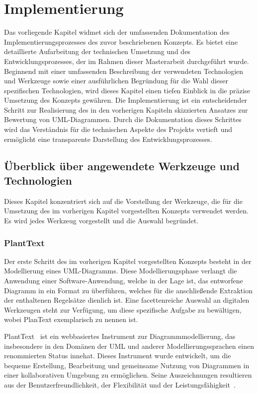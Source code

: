 \chapter{Implementierung}\label{ch:implementierung}

Das vorliegende Kapitel widmet sich der umfassenden Dokumentation des Implementierungsprozesses des zuvor beschriebenen
Konzepts. Es bietet eine detaillierte Aufarbeitung der technischen Umsetzung und des Entwicklungsprozesses, der im
Rahmen dieser Masterarbeit durchgeführt wurde. Beginnend mit einer umfassenden Beschreibung der verwendeten Technologien
und Werkzeuge sowie einer ausführlichen Begründung für die Wahl dieser spezifischen Technologien, wird dieses Kapitel
einen tiefen Einblick in die präzise Umsetzung des Konzepts gewähren. Die Implementierung ist ein entscheidender Schritt
zur Realisierung des in den vorherigen Kapiteln skizzierten Ansatzes zur Bewertung von UML-Diagrammen. Durch die
Dokumentation dieses Schrittes wird das Verständnis für die technischen Aspekte des Projekts vertieft und ermöglicht
eine transparente Darstellung des Entwicklungsprozesses.

\section{Überblick über angewendete Werkzeuge und Technologien}
Dieses Kapitel konzentriert sich auf die Vorstellung der Werkzeuge, die für die Umsetzung des im vorherigen Kapitel
vorgestellten Konzepts verwendet werden. Es wird jedes Werkzeug vorgestellt und die Auswahl begründet.

\subsection{PlantText}

Der erste Schritt des im vorherigen Kapitel vorgestellten Konzepts besteht in der Modellierung eines UML-Diagramms.
Diese Modellierungsphase verlangt die Anwendung einer Software-Anwendung, welche in der Lage ist, das entworfene
Diagramm in ein Format zu überführen, welches für die anschließende Extraktion der enthaltenen Regelsätze dienlich
ist. Eine facettenreiche Auswahl an digitalen Werkzeugen steht zur Verfügung, um diese spezifische Aufgabe zu
bewältigen, wobei PlanText exemplarisch zu nennen ist.

PlantText~\cite{planttext} ist ein webbasiertes Instrument zur Diagrammmodellierung, das insbesondere in den Domänen
der UML und anderer Modellierungssprachen einen renommierten Status innehat. Dieses Instrument wurde entwickelt,
um die bequeme Erstellung, Bearbeitung und gemeinsame Nutzung von Diagrammen in einer kollaborativen Umgebung zu
ermöglichen. Seine Auszeichnungen resultieren aus der Benutzerfreundlichkeit, der Flexibilität und der
Leistungsfähigkeit~\cite{planttext}.

